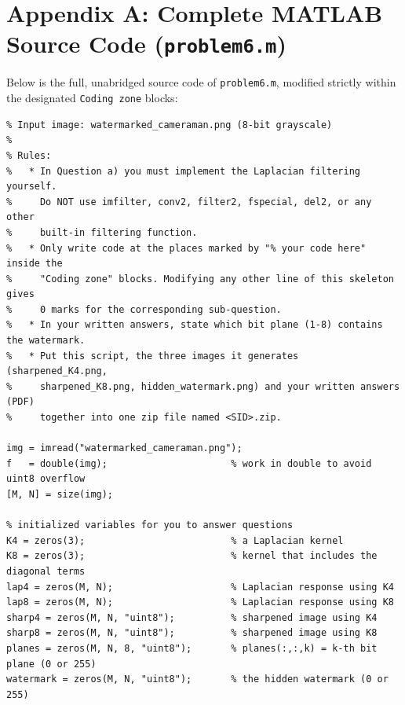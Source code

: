 \documentclass[11pt,a4paper]{article}
\begin{document}
\newpage
\appendix
\section{Appendix A: Complete MATLAB Source Code (\texttt{problem6.m})}
\label{sec:matlab_code}
Below is the full, unabridged source code of \texttt{problem6.m}, modified strictly within the designated \texttt{Coding zone} blocks:

\begin{lstlisting}[caption={Complete and unabridged implementation of \texttt{problem6.m}.}]
%% COMP4421 Assignment 1 - Programming Problem 6 (20 pts)
% Input image: watermarked_cameraman.png (8-bit grayscale)
%
% Rules:
%   * In Question a) you must implement the Laplacian filtering yourself.
%     Do NOT use imfilter, conv2, filter2, fspecial, del2, or any other
%     built-in filtering function.
%   * Only write code at the places marked by "% your code here" inside the
%     "Coding zone" blocks. Modifying any other line of this skeleton gives
%     0 marks for the corresponding sub-question.
%   * In your written answers, state which bit plane (1-8) contains the watermark.
%   * Put this script, the three images it generates (sharpened_K4.png,
%     sharpened_K8.png, hidden_watermark.png) and your written answers (PDF)
%     together into one zip file named <SID>.zip.

img = imread("watermarked_cameraman.png");
f   = double(img);                      % work in double to avoid uint8 overflow
[M, N] = size(img);

% initialized variables for you to answer questions
K4 = zeros(3);                          % a Laplacian kernel
K8 = zeros(3);                          % kernel that includes the diagonal terms
lap4 = zeros(M, N);                     % Laplacian response using K4
lap8 = zeros(M, N);                     % Laplacian response using K8
sharp4 = zeros(M, N, "uint8");          % sharpened image using K4
sharp8 = zeros(M, N, "uint8");          % sharpened image using K8
planes = zeros(M, N, 8, "uint8");       % planes(:,:,k) = k-th bit plane (0 or 255)
watermark = zeros(M, N, "uint8");       % the hidden watermark (0 or 255)


\end{lstlisting}
\end{document}

